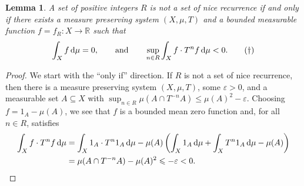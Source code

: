 \documentclass[reqno,a4paper,12pt]{amsart}
\newtheorem{lemma}[theorem]{Lemma}
\theoremstyle{definition}
\theoremstyle{remark}
\def\d{{\,{\rm d}}}
\def \R {\mathbb{R}}
\def\eps{\varepsilon}
\begin{document}
\begin{lemma}\label{lem1}
    A set of positive integers $R$ is not a set of nice recurrence if and only if there exists a measure preserving system $(X,\mu,T)$ and a bounded measurable function $f=f_R:X\to\R$ such that
    \begin{equation}\label{eqn1}
        \int_X f \d\mu = 0, \qquad\text{and}\qquad \sup_{n\in R}\int_X f\cdot T^nf\d\mu < 0.\tag{$\dagger$}
    \end{equation}
\end{lemma}
\begin{proof}
    We start with the ``only if'' direction. If $R$ is not a set of nice recurrence, then there is a measure preserving system $(X,\mu,T)$, some $\eps > 0$, and a measurable set $A\subseteq X$ with $\sup_{n\in R}\mu(A\cap T^{-n} A) \leqslant \mu(A)^2 - \eps$. Choosing $f = 1_A - \mu(A)$, we see that $f$ is a bounded mean zero function and, for all $n\in R$, satisfies
    \begin{align*}
        \int_X f\cdot T^nf \d\mu &= \int_X 1_A\cdot T^n 1_A \d\mu - \mu(A)\left( \int_X 1_A\d\mu + \int_X T^n1_A\d\mu - \mu(A)\right)\\
        &= \mu(A\cap T^{-n}A) - \mu(A)^2 \leqslant -\eps < 0.
    \end{align*}


\end{proof}
\end{document}
